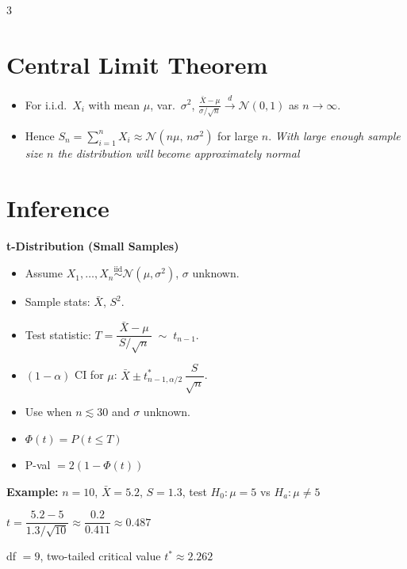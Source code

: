 \documentclass[10pt,landscape]{article}
\begin{document}
\begin{multicols}{3}
\section{Central Limit Theorem}
\begin{itemize}
  \item For i.i.d.\ $X_i$ with mean $\mu$, var.\ $\sigma^2$, $\displaystyle \frac{\bar X - \mu}{\sigma/\sqrt{n}} \xrightarrow{d} \mathcal{N}(0,1)$ as $n\to\infty$.
  \item Hence $\displaystyle S_n = \sum_{i=1}^n X_i \approx \mathcal{N}(n\mu,\,n\sigma^2)$ for large $n$.
\noindent \textit{With large enough sample size $n$ the distribution will become approximately normal}
\end{itemize}

\section{Inference}

\textbf{t-Distribution (Small Samples)}
\begin{itemize}
  \item Assume $X_1,\dots,X_n \overset{\text{iid}}{\sim} \mathcal{N}(\mu,\sigma^2)$, $\sigma$ unknown.
  \item Sample stats: $\bar X$, $S^2$.
  \item Test statistic: $\displaystyle T = \dfrac{\bar X-\mu}{\,S/\sqrt{n}\,}\;\sim\;t_{n-1}$.
  \item $(1-\alpha)$ CI for $\mu$: $\displaystyle \bar X \pm t^{*}_{n-1,\alpha/2}\,\dfrac{S}{\sqrt{n}}$.
  \item Use when $n\lesssim30$ and $\sigma$ unknown.
  \item $\Phi (t) = P(t \leq T)$
  \item P-val $= 2(1-\Phi (t))$
\end{itemize}

\textbf{Example:} $n = 10$, $\bar X = 5.2$, $S = 1.3$, test $H_0: \mu = 5$ vs $H_a: \mu \ne 5$

$t = \dfrac{5.2 - 5}{1.3/\sqrt{10}} \approx \dfrac{0.2}{0.411} \approx 0.487$

df $= 9$, two-tailed critical value $t^* \approx 2.262$


\end{multicols}
\end{document}

